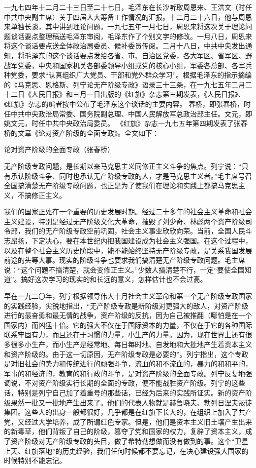 \begin{maonote}
一九七四年十二月二十三日至二十七日，毛泽东在长沙听取周恩来、王洪文（时任中共中央副主席）关于四届人大筹备工作情况的汇报。十二月二十六日，他与周恩来单独长谈，其中讲到理论问题。一九七五年一月七日，周恩来将这次关于理论问题谈话要点整理稿送毛泽东审阅，毛泽东作了个别文字的修改。一月八日，周恩来将这个谈话要点送全体政治局委员、候补委员传阅。二月十八日，中共中央发出通知，将毛泽东的这个谈话要点发给各省、市、自治区党委，各大军区、省军区、野战军党委，中央和国家机关各部委领导小组或党的核心小组，军委各总部、各军兵种党委，要求“认真组织广大党员、干部和党外群众学习”。根据毛泽东的指示摘编的《马克思、恩格斯、列宁论无产阶级专政》语录三十三条，在一九七五年二月二十二日《人民日报》和三月一日出版的《红旗》杂志第三期发表，《人民日报》、《红旗》杂志的编者按中公布了毛泽东这个谈话的主要内容。
春桥，即张春桥，时任中共中央政治局常委、国务院副总理、中国人民解放军总政治部主任。文元，即姚文元，时任中共中央政治局委员。
《红旗》杂志一九七五年第四期发表了张春桥的文章《论对资产阶级的全面专政》。全文如下：

论对资产阶级的全面专政（张春桥）

无产阶级专政问题，是长期以来马克思主义同修正主义斗争的焦点。列宁说：“只有承认阶级斗争、同时也承认无产阶级专政的人，才是马克思主义者。”毛主席号召全国搞清楚无产阶级专政问题，也正是为了使我们在理论和实践上都搞马克思主义，不搞修正主义。

我们的国家正处在一个重要的历史发展时期。经过二十多年的社会主义革命和社会主义建设，特别是经过无产阶级文化大革命，摧毁了刘少奇、林彪两个资产阶级司令部，我们的无产阶级专政空前巩固，社会主义事业欣欣向荣。当前，全国人民斗志昂扬，下定决心，要在本世纪内把我国建设成为社会主义强国。在这个过程中，以及在整个社会主义历史阶段中，能不能始终坚持无产阶级专政，是关系我国发展前途的头等大事。现实的阶级斗争也要求我们搞清楚无产阶级专政问题。毛主席说：“这个问题不搞清楚，就会变修正主义。”少数人搞清楚不行，一定“要使全国知道”。搞好这次学习的现实的和长远的意义，怎样估计也不会过高。

早在一九二〇年，列宁根据领导伟大十月社会主义革命和第一个无产阶级专政国家的实践经验，尖锐地指出，“无产阶级专政是新阶级对更强大的敌人，对资产阶级进行的最奋勇和最无情的战争，资产阶级的反抗，因为自己被推翻（哪怕是在一个国家内）而凶猛十倍。它的强大不仅在于国际资本的力量，不仅在于它的各种国际联系牢固有力，而且还在于习惯的力量，小生产的力量。因为，现在世界上还有很多很多小生产，而小生产是经常地、每日每时地、自发地和大批地产生着资本主义和资产阶级的。由于这一切原因，无产阶级专政是必要的”。列宁指出，这个专政是对旧社会的势力和传统进行的顽强斗争，流血的和不流血的，暴力的和和平的，军事的和经济的，教育的和行政的斗争，是对资产阶级的全面专政。列宁反复地强调说，不对资产阶级实行长期的全面的专政，便不能战胜资产阶级。列宁的这些话，特别是列宁自己加了着重号的那些话，已经为后来的实践所证实。新的资产阶级果然一批又一批地产生出来了。他们的代表人物就是赫鲁晓夫、勃列日涅夫叛徒集团。这些人的出身一般都很好，几乎都是在红旗下长大的，在组织上加入了共产党，又经过大学培养，成了所谓红色专家。但是，他们是资本主义旧土壤产生出来的新毒草，他们背叛了自己的阶级，篡夺了党和国家的权力，复辟了资本主义，成了资产阶级对无产阶级专政的头目，做了希特勒想做而没有做到的事。这个“卫星上天、红旗落地”的历史经验，我们任何时候都不要忘记，在决心建设强大国家的时候特别不能忘记。


\end{maonote}
